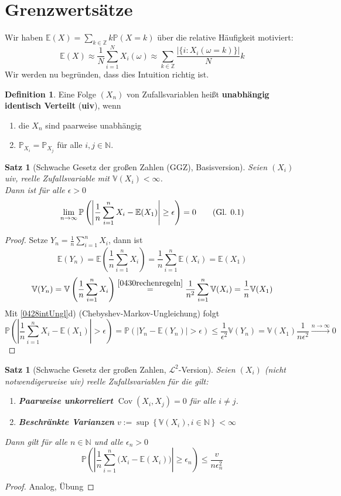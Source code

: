 \documentclass[10pt,a4paper]{article}
\newcommand{\N}{\ensuremath{\mathbb{N}}}
\newcommand{\Z}{\ensuremath{\mathbb{Z}}}
\newcommand{\abs}[1]{\left|#1\right|}
\newcommand{\Prb}{\mathbb P}
\newcommand{\Epv}{\ensuremath{\mathbb{E}}}
\newcommand{\Var}{\mathbb{V}}
\newcommand{\Cov}{\operatorname{Cov}}
\newcommand{\scL}{\mathscr L}
\theoremstyle{plain}
\newtheorem{satz}[theorem]{Satz}
\theoremstyle{definition}
\newtheorem{definition}[theorem]{Definition}
\theoremstyle{remark}
\newcommand{\autotag}{\stepcounter{equation}\tag{Gl. \arabic{section}.\arabic{equation}}}
\begin{document}

\section{Grenzwertsätze}
	Wir haben $\Epv(X)=\sum_{k\in\Z}k\Prb(X=k)$ über die relative Häufigkeit motiviert: 
	\[\Epv(X)\approx\frac{1}{N}\sum_{i=1}^NX_i(\omega)\approx\sum_{k\in\Z}\frac{|\{i:X_i(\omega=k)\}|}{N}k\]
	Wir werden nu begründen, dass dies Intuition richtig ist.
	
	\begin{definition}
		Eine Folge $(X_n)$ von Zufallsvariablen heißt \textbf{unabhängig identisch Verteilt} (\textbf{uiv}), wenn
		\begin{enumerate}[label=(\roman*)]
			\item die $X_n$ sind paarweise unabhängig
			\item $\Prb_{X_i}=\Prb_{X_j}$ für alle $i,j\in\N$.
		\end{enumerate}
	\end{definition}

	\begin{satz}[Schwache Gesetz der großen Zahlen (GGZ), Basisversion]\label{0502satzGGZschwach}
		Seien $(X_i)$ uiv, reelle Zufallsvariable mit $\Var(X_i)<\infty$.\\
		Dann ist für alle $\epsilon>0$
		\[\lim\limits_{n\to\infty}\Prb\left(\abs{\frac{1}{n}\sum_{i=1}^{n}X_i-\Epv(X_1)}\geq \epsilon\right)=0 \autotag\label{eq:0501}\]
	\end{satz}
	\begin{proof}
		Setze $Y_n=\frac{1}{n}\sum_{i=1}^{n}X_i$, dann ist 
		\[\Epv(Y_n)=\Epv\left(\frac{1}{n}\sum_{i=1}^{n}X_i\right)=\frac{1}{n}\sum_{i=1}^{n}\Epv(X_i)=\Epv(X_1)\]
		\[\Var(Y_n)=\Var\left(\frac{1}{n}\sum_{i=1}^{n}X_i\right)\overset{\ref{0430rechenregeln}}{=}\frac{1}{n^2}\sum_{i=1}^{n}\Var(X_i)=\frac{1}{n}\Var(X_1)\]
		Mit \ref{0428intUngl}d) (Chebyshev-Markov-Ungleichung) folgt
		\[\Prb\left(\abs{\frac{1}{n}\sum_{i=1}^{n}X_i-\Epv(X_1)}>\epsilon\right)=\Prb\left(\abs{Y_n-\Epv(Y_n)}>\epsilon\right)\leq\frac{1}{\epsilon^2}\Var(Y_n)=\Var(X_1)\frac{1}{n\epsilon^2}\xrightarrow{n\to\infty}0\]
	\end{proof}

	\begin{satz}[Schwache Gesetz der großen Zahlen, $\scL^2$-Version]\label{0503satzGGZL^2}
		Seien $(X_i)$ (nicht notwendigerweise uiv) reelle Zufallsvariablen für die gilt:
		\begin{enumerate}[label=(\roman*)]
			\item \textbf{Paarweise unkorreliert} $\Cov(X_i,X_j)=0$ für alle $i\neq j$.
			\item \textbf{Beschränkte Varianzen} $v:=\sup\left\{\Var(X_i),i\in\N\right\}<\infty$
		\end{enumerate}
		Dann gilt für alle $n\in \N$ und alle $\epsilon_n>0$
		\[\Prb\left(\abs{\frac{1}{n}\sum_{i=1}^{n}\big(X_i-\Epv(X_i)\big)}\geq\epsilon_n\right)\leq\frac{v}{n\epsilon_n^2}\]
	\end{satz}
	\begin{proof}
		Analog, Übung %
	\end{proof}
	
\end{document}
